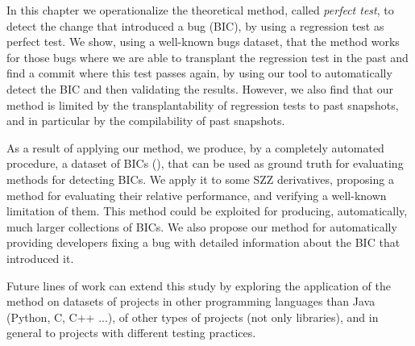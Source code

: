 


In this chapter we operationalize the theoretical method, called \emph{perfect test}, to detect the change that introduced a bug (BIC), by using a regression test as perfect test. We show, using a well-known bugs dataset, that the method works for those bugs where we are able to transplant the regression test in the past and find a commit where this test passes again, by using our tool to automatically detect the BIC and then validating the results. 
However, we also find that our method is limited by the transplantability of regression tests to past snapshots, and in particular by the compilability of past snapshots.

As a result of applying our method, we produce, by a completely automated procedure, a dataset of BICs (\datasetName), that can be used as ground truth for evaluating methods for detecting BICs. 
We apply it to some SZZ derivatives, proposing a method for evaluating their relative performance, and verifying a well-known limitation of them. 
This method could be exploited for producing, automatically, much larger collections of BICs. 
We also propose our method for automatically providing developers fixing a bug with detailed information about the BIC that introduced it.

Future lines of work can extend this study by exploring the application of the method on datasets of projects in other programming languages than Java (Python, C, C++ ...), of other types of projects (not only libraries), and in general to projects with different testing practices.
